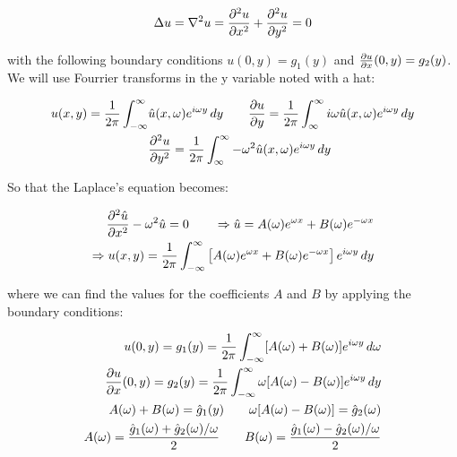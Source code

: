 \begin{equation}
\Delta u = \nabla ^2 u = \frac{\partial^2 u}{\partial x^2} + \frac{\partial^2 u}{\partial y^2}=0
\end{equation}

with the following boundary conditions $u(0,y) = g_1(y)$ and $\frac{\partial u}{\partial x} (0,y) = g_2 (y)$. We will use Fourrier transforms in the y variable noted with a hat: 

\begin{equation}
\begin{aligned}
u(x,y) = \frac{1}{2\pi}\int _{-\infty} ^\infty &\hat{u} (x,\omega) e^{i\omega y} \, dy \qquad \frac{\partial u }{\partial y} = \frac{1}{2\pi} \int _{\infty} ^\infty   i \omega \hat{u} (x,\omega )e^{i\omega y} \, dy \\
 &\frac{\partial^2 u}{\partial y^2}= \frac{1}{2\pi} \int _{\infty} ^\infty   - \omega ^2\hat{u} (x,\omega )e^{i\omega y} \, dy
\end{aligned}
\end{equation}

So that the Laplace's equation becomes: 

\begin{equation}
\begin{aligned}
\frac{\partial ^2 \hat{u}}{\partial x^2} - \omega ^2 \hat{u} = 0 \qquad \Rightarrow \hat{u} = A(\omega) e^{\omega x} + B(\omega) e^{-\omega x}\\
\Rightarrow u(x,y) = \frac{1}{2\pi } \int _{-\infty} ^\infty \left[A(\omega ) e^{\omega x} + B(\omega ) e^{-\omega x} \right] e^{i\omega y} \, dy
\end{aligned}
\end{equation}

where we can find the values for the coefficients $A$ and $B$ by applying the boundary conditions:

\begin{equation}
\begin{aligned}
u(0, y) = g_1(y) = \frac{1}{2\pi} \int _{-\infty} ^{\infty} [A(\omega) + B(\omega)] e^{i\omega y} \, d\omega \\
\frac{\partial u}{\partial x} (0,y) = g_2(y) = \frac{1}{2\pi} \int _{-\infty }^{\infty} \omega [A(\omega) - B(\omega) ]e^{i\omega y} \, dy\\
A(\omega) +B(\omega ) = \hat{g}_1(y) \qquad  \omega [A(\omega) - B(\omega) ] = \hat{g}_2 (\omega)\\
A(\omega) = \frac{\hat{g}_1(\omega)+ \hat{g}_2(\omega)/\omega}{2} \qquad B(\omega) = \frac{\hat{g}_1(\omega)- \hat{g}_2(\omega)/\omega}{2}
\end{aligned}
\end{equation}

